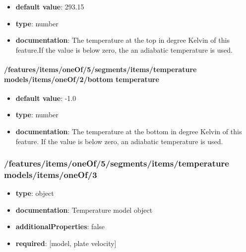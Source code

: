 \begin{itemize}\item {\bf default value}: 293.15
\item {\bf type}: number
\item {\bf documentation}: The temperature at the top in degree Kelvin of this feature.If the value is below zero, the an adiabatic temperature is used.
\end{itemize}\paragraph{/features/items/oneOf/5/segments/items/temperature models/items/oneOf/2/bottom temperature}
\begin{itemize}\item {\bf default value}: -1.0
\item {\bf type}: number
\item {\bf documentation}: The temperature at the bottom in degree Kelvin of this feature. If the value is below zero, an adiabatic temperature is used.
\end{itemize}\subsubsection{/features/items/oneOf/5/segments/items/temperature models/items/oneOf/3}
\begin{itemize}\item {\bf type}: object
\item {\bf documentation}: Temperature model object
\item {\bf additionalProperties}: false
\item {\bf required}: [model, plate velocity]\end{itemize}
